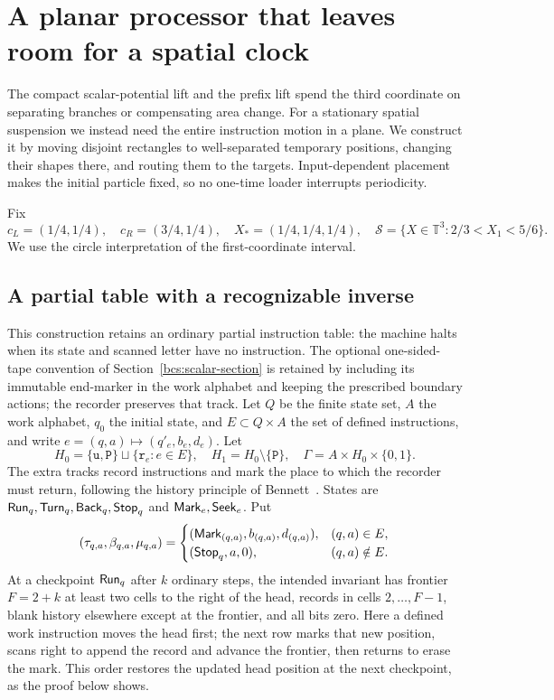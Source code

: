 \section{A planar processor that leaves room for a spatial clock}\label{bcs:expanded-section}
The compact scalar-potential lift and the prefix lift spend the third coordinate on separating branches or compensating area change. For a stationary spatial suspension we instead need the entire instruction motion in a plane. We construct it by moving disjoint rectangles to well-separated temporary positions, changing their shapes there, and routing them to the targets. Input-dependent placement makes the initial particle fixed, so no one-time loader interrupts periodicity.

Fix
\[
 c_L=(1/4,1/4),\quad c_R=(3/4,1/4),\quad
 X_*=(1/4,1/4,1/4),\quad
 \mathcal S=\{X\in\mathbb T^3:2/3<X_1<5/6\}.
\]
We use the circle interpretation of the first-coordinate interval.

\subsection{A partial table with a recognizable inverse}
This construction retains an ordinary partial instruction table: the machine halts when its state and scanned letter have no instruction. The optional one-sided-tape convention of Section~\ref{bcs:scalar-section} is retained by including its immutable end-marker in the work alphabet and keeping the prescribed boundary actions; the recorder preserves that track. Let $Q$ be the finite state set, $A$ the work alphabet, $q_0$ the initial state, and $E\subset Q\times A$ the set of defined instructions, and write $e=(q,a)\mapsto(q'_e,b_e,d_e)$. Let
\[
 H_0=\{\mathtt u,\mathtt P\}\sqcup\{\mathtt r_e:e\in E\},
 \quad H_1=H_0\setminus\{\mathtt P\},\quad
 \Gamma=A\times H_0\times\{0,1\}.
\]
The extra tracks record instructions and mark the place to which the recorder must return, following the history principle of Bennett~\cite{Bennett1973}. States are ${\sf Run}_q,{\sf Turn}_q,{\sf Back}_q,{\sf Stop}_q$ and ${\sf Mark}_e,{\sf Seek}_e$. Put
\[
 (\tau_{q,a},\beta_{q,a},\mu_{q,a})=
 \begin{cases}({\sf Mark}_{(q,a)},b_{(q,a)},d_{(q,a)}),&(q,a)\in E,\\
 ({\sf Stop}_q,a,0),&(q,a)\notin E.
 \end{cases}
\]
At a checkpoint ${\sf Run}_q$ after $k$ ordinary steps, the intended invariant has frontier $F=2+k$ at least two cells to the right of the head, records in cells $2,\ldots,F-1$, blank history elsewhere except at the frontier, and all bits zero. Here a defined work instruction moves the head first; the next row marks that new position, scans right to append the record and advance the frontier, then returns to erase the mark. This order restores the updated head position at the next checkpoint, as the proof below shows.

